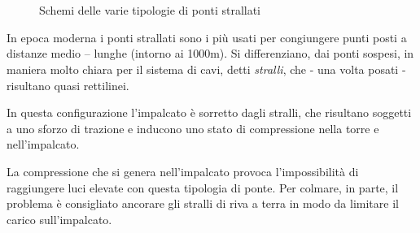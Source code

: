 \begin{figure}
	\centering
	\\
	\\
	\caption{Schemi delle varie tipologie di ponti strallati}
	\label{fig:cable_stayed_bridge}
\end{figure}



In epoca moderna i ponti strallati sono i più usati per congiungere punti posti a distanze medio -- lunghe (intorno ai 1000\si{m}).
Si differenziano, dai ponti sospesi, in maniera molto chiara per il sistema di cavi, detti \emph{stralli}, che - una volta posati - risultano quasi rettilinei.

In questa configurazione l'impalcato è sorretto dagli stralli, che risultano soggetti a uno sforzo di trazione e inducono uno stato di compressione nella torre e nell'impalcato.

La compressione che si genera nell'impalcato provoca l'impossibilità di raggiungere luci elevate con questa tipologia di ponte. Per colmare, in parte, il problema è consigliato ancorare gli stralli di riva a terra in modo da limitare il carico sull'impalcato.



